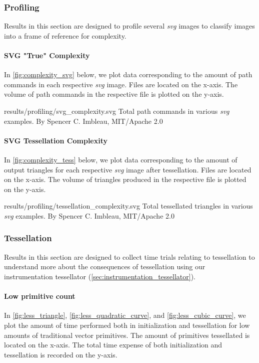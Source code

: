 \subsubsection{Profiling}\label{sec:results_profiling}
Results in this section are designed to profile several \textit{svg} images to classify images into a frame of reference for complexity.

\paragraph{SVG "True" Complexity}
In \cref{fig:complexity_svg} below, we plot data corresponding to the amount of path commands in each respective \textit{svg} image. Files are located on the x-axis. The volume of path commands in the respective file is plotted on the y-axis.\medskip

\widesvg
{results/profiling/svg_complexity.svg}
{Total path commands in various \textit{svg} examples.\label{fig:complexity_svg}}
{By Spencer C. Imbleau, MIT/Apache 2.0}\medskip

\paragraph{SVG Tessellation Complexity}
In \cref{fig:complexity_tess} below, we plot data corresponding to the amount of output triangles for each respective \textit{svg} image after tessellation. Files are located on the x-axis. The volume of triangles produced in the respective file is plotted on the y-axis.\medskip

\widesvg
{results/profiling/tessellation_complexity.svg}
{Total tessellated triangles in various \textit{svg} examples.\label{fig:complexity_tess}}
{By Spencer C. Imbleau, MIT/Apache 2.0}


\subsubsection{Tessellation}\label{sec:results_tessellation}
Results in this section are designed to collect time trials relating to tessellation to understand more about the consequences of tessellation using our instrumentation tessellator (\cref{sec:instrumentation_tessellator}).

\paragraph{Low primitive count}
In \cref{fig:less_triangle}, \cref{fig:less_quadratic_curve}, and \cref{fig:less_cubic_curve}, we plot the amount of time performed both in initialization and tessellation for low amounts of traditional vector primitives. The amount of primitives tessellated is located on the x-axis. The total time expense of both initialization and tessellation is recorded on the y-axis.\medskip

